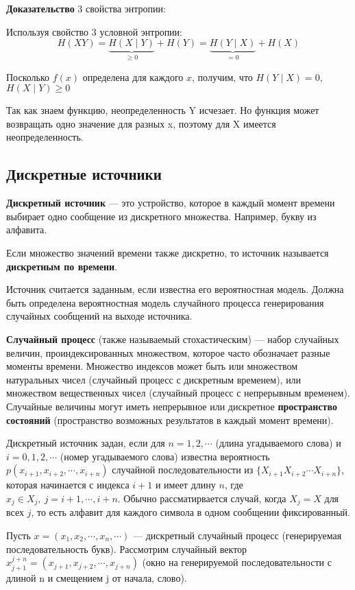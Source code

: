 \textbf{Доказательство} 3 свойства энтропии:

Используя свойство 3 условной энтропии:
\[
    H(XY) = \underbrace{H(X \mid Y)}_{\geq 0} + H(Y) = \underbrace{H(Y \mid
    X)}_{=0} + H(X)
\]

Посколько $f(x)$ определена для каждого $x$, получим, что $H(Y \mid X) = 0$,
$H(X \mid Y) \geq 0$

Так как знаем функцию, неопределенность Y исчезает. Но функция может
возвращать одно значение для разных x, поэтому для X имеется неопределенность.



\subsection{Дискретные источники}

\textbf{Дискретный источник} --- это устройство, которое в каждый момент
времени выбирает одно сообщение из дискретного множества. Например, букву из
алфавита.

Если множество значений времени также дискретно, то источник называется
\textbf{дискретным по времени}.

Источник считается заданным, если известна его вероятностная модель. Должна
быть определена вероятностная модель случайного процесса генерирования
случайных сообщений на выходе источника.

\textbf{Случайный процесс} (также называемый стохастическим) --- набор
случайных величин, проиндексированных множеством, которое часто
обозначает разные моменты времени. Множество индексов может быть или множеством
натуральных чисел (случайный процесс с дискретным временем), или множеством
вещественных чисел (случайный процесс с непрерывным временем). Случайные
величины могут иметь
непрерывное или дискретное \textbf{пространство состояний} (пространство возможных
результатов в каждый момент времени).

Дискретный источник задан, если для $n = 1, 2, \cdots$ (длина угадываемого
слова) и $i = 0, 1, 2, \cdots$ (номер угадываемого слова)
известна вероятность $p(x_{i+1}, x_{i+2}, \cdots, x_{i+n})$ случайной
последовательности из $\{ X_{i+1} X_{i+2} \cdots X_{i+n} \}$, которая
начинается с индекса $i + 1$ и имеет длину $n$, где $x_j \in X_j,\ j = i + 1,
\cdots, i + n$. Обычно рассматирвается случай, когда $X_j = X$ для всех $j$, то
есть алфавит для каждого символа в одном сообщении фиксированный.

Пусть $x = (x_1, x_2, \cdots, x_n, \cdots)$ --- дискретный случайный процесс
(генерируемая последовательность букв).
Рассмотрим случайный вектор $x^{j+n}_{j+1} = (x_{j+1}, x_{j+2}, \cdots,
x_{j+n})$ (окно на генерируемой последовательности с длиной n и смещением j от
начала, слово).

